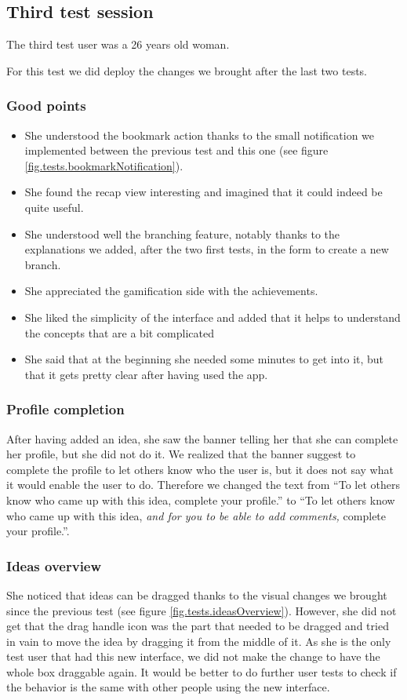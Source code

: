 \documentclass[a4paper,12pt, oneside]{article}
\begin{document}
\FloatBarrier
\subsection{Third test session}
The third test user was a 26 years old woman.

For this test we did deploy the changes we brought after the last two tests.

\subsubsection*{Good points}
\begin{itemize}
    \item She understood the bookmark action thanks to the small notification we implemented between the previous test and this one (see figure \ref{fig.tests.bookmarkNotification}).
    \item She found the recap view interesting and imagined that it could indeed be quite useful.
    \item She understood well the branching feature, notably thanks to the explanations we added, after the two first tests, in the form to create a new branch.
    \item She appreciated the gamification side with the achievements.
    \item She liked the simplicity of the interface and added that it helps to understand the concepts that are a bit complicated
    \item She said that at the beginning she needed some minutes to get into it, but that it gets pretty clear after having used the app.
\end{itemize}

\subsubsection*{Profile completion}
After having added an idea, she saw the banner telling her that she can complete her profile, but she did not do it.
We realized that the banner suggest to complete the profile to let others know who the user is, but it does not say what it would enable the user to do.
Therefore we changed the text from “To let others know who came up with this idea, complete your profile.” to “To let others know who came up with this idea, \emph{and for you to be able to add comments,} complete your profile.”.

\subsubsection*{Ideas overview}
She noticed that ideas can be dragged thanks to the visual changes we brought since the previous test (see figure \ref{fig.tests.ideasOverview}).
However, she did not get that the drag handle icon was the part that needed to be dragged and tried in vain to move the idea by dragging it from the middle of it.
As she is the only test user that had this new interface, we did not make the change to have the whole box draggable again.
It would be better to do further user tests to check if the behavior is the same with other people using the new interface.
\end{document}
